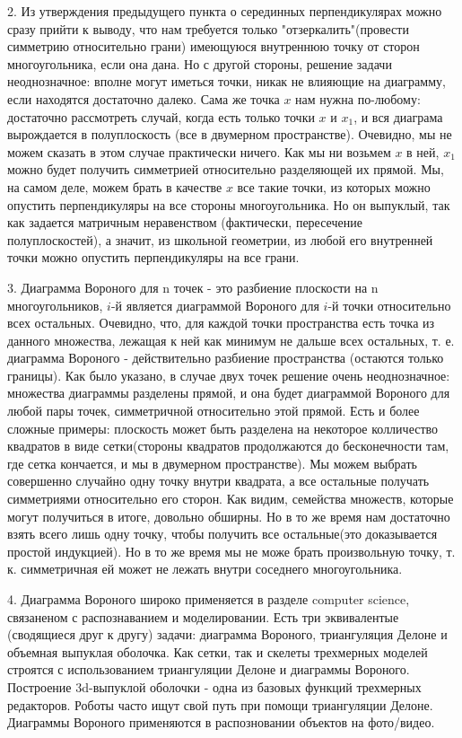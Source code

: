 \documentclass{article}
\begin{document}
2.  Из утверждения предыдущего пункта о серединных перпендикулярах можно сразу прийти к выводу, что нам требуется только "отзеркалить"(провести симметрию относительно грани) имеющуюся внутреннюю точку от сторон многоугольника, если она дана. Но с другой стороны, решение задачи неоднозначное: вполне могут иметься точки, никак не влияющие на диаграмму, если находятся достаточно далеко. Сама же точка $x$ нам нужна по-любому: достаточно рассмотреть случай, когда есть только точки $x$ и $x_1$, и вся диаграма вырождается в полуплоскость (все в двумерном пространстве). Очевидно, мы не можем сказать в этом случае практически ничего. Как мы ни возьмем $x$ в ней, $x_1$ можно будет получить симметрией относительно разделяющей их прямой. Мы, на самом деле, можем брать в качестве $x$ все такие точки, из которых можно опустить перпендикуляры на все стороны многоугольника. Но он выпуклый, так как задается матричным неравенством (фактически, пересечение полуплоскостей), а значит, из школьной геометрии, из любой его внутренней точки можно опустить перпендикуляры на все грани.

3.  Диаграмма Вороного для n точек - это разбиение плоскости на n многоугольников, $i$-й является диаграммой Вороного для $i$-й точки относительно всех остальных. Очевидно, что, для каждой точки пространства есть точка из данного множества, лежащая к ней как минимум не дальше всех остальных, т. е. диаграмма Вороного - действительно разбиение пространства (остаются только границы). Как было указано, в случае двух точек решение очень неоднозначное: множества диаграммы разделены прямой, и она будет диаграммой Вороного для любой пары точек, симметричной относительно этой прямой. Есть и более сложные примеры: плоскость может быть разделена на некоторое колличество квадратов в виде сетки(стороны квадратов продолжаются до бесконечности там, где сетка кончается, и мы в двумерном пространстве). Мы можем выбрать совершенно случайно одну точку внутри квадрата, а все остальные получать симметриями относительно его сторон. Как видим, семейства множеств, которые могут получиться в итоге, довольно обширны. Но в то же время нам достаточно взять всего лишь одну точку, чтобы получить все остальные(это доказывается простой индукцией). Но в то же время мы не може брать произвольную точку, т. к. симметричная ей может не лежать внутри соседнего многоугольника. 

4.  Диаграмма Вороного широко применяется в разделе computer science, связаненом с распознаванием и моделировании. Есть три эквивалентые (сводящиеся друг к другу) задачи: диаграмма Вороного, триангуляция Делоне и объемная выпуклая оболочка. Как сетки, так и скелеты трехмерных моделей строятся с использованием триангуляции Делоне и диаграммы Вороного. Построение 3d-выпуклой оболочки - одна из базовых функций трехмерных редакторов. Роботы часто ищут свой путь при помощи триангуляции Делоне. Диаграммы Вороного применяются в распозновании объектов на фото/видео.
\end{document}
